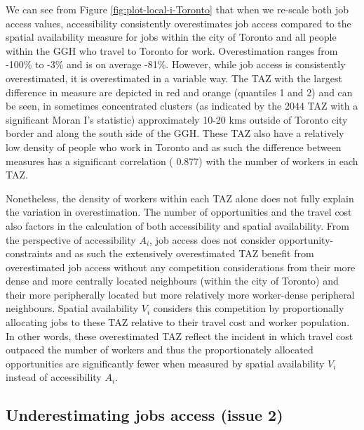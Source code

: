 \documentclass[]{elsarticle} %
\begin{document}
We can see from Figure \ref{fig:plot-local-i-Toronto} that when we
re-scale both job access values, accessibility consistently
overestimates job access compared to the spatial availability measure
for jobs within the city of Toronto and all people within the GGH who
travel to Toronto for work. Overestimation ranges from -100\% to -3\%
and is on average -81\%. However, while job access is consistently
overestimated, it is overestimated in a variable way. The TAZ with the
largest difference in measure are depicted in red and orange (quantiles
1 and 2) and can be seen, in sometimes concentrated clusters (as
indicated by the 2044 TAZ with a significant Moran I's statistic)
approximately 10-20 kms outside of Toronto city border and along the
south side of the GGH. These TAZ also have a relatively low density of
people who work in Toronto and as such the difference between measures
has a significant correlation ( 0.877) with the number of workers in
each TAZ.

Nonetheless, the density of workers within each TAZ alone does not fully
explain the variation in overestimation. The number of opportunities and
the travel cost also factors in the calculation of both accessibility
and spatial availability. From the perspective of accessibility \(A_i\),
job access does not consider opportunity-constraints and as such the
extensively overestimated TAZ benefit from overestimated job access
without any competition considerations from their more dense and more
centrally located neighbours (within the city of Toronto) and their more
peripherally located but more relatively more worker-dense peripheral
neighbours. Spatial availability \(V_i\) considers this competition by
proportionally allocating jobs to these TAZ relative to their travel
cost and worker population. In other words, these overestimated TAZ
reflect the incident in which travel cost outpaced the number of workers
and thus the proportionately allocated opportunities are significantly
fewer when measured by spatial availability \(V_i\) instead of
accessibility \(A_i\).

\hypertarget{underestimating-jobs-access-issue-2}{%
\subsection{Underestimating jobs access (issue
2)}\label{underestimating-jobs-access-issue-2}}
\end{document}
